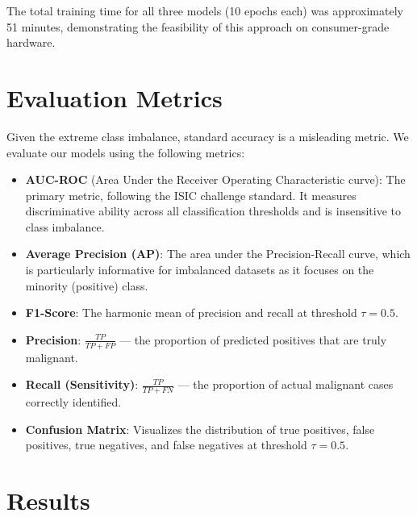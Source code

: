 \documentclass[11pt, a4paper, twocolumn]{article}
\begin{document}
The total training time for all three models (10 epochs each) was
approximately 51 minutes, demonstrating the feasibility of this
approach on consumer-grade hardware.

\section{Evaluation Metrics}
\label{sec:metrics}

Given the extreme class imbalance, standard accuracy is a misleading
metric. We evaluate our models using the following metrics:

\begin{itemize}[noitemsep]
    \item \textbf{AUC-ROC} (Area Under the Receiver Operating
          Characteristic curve): The primary metric, following the
          ISIC challenge standard. It measures discriminative ability
          across all classification thresholds and is insensitive to
          class imbalance.

    \item \textbf{Average Precision (AP)}: The area under the
          Precision-Recall curve, which is particularly informative
          for imbalanced datasets as it focuses on the minority
          (positive) class.

    \item \textbf{F1-Score}: The harmonic mean of precision and recall
          at threshold $\tau = 0.5$.

    \item \textbf{Precision}: $\frac{TP}{TP + FP}$ --- the proportion
          of predicted positives that are truly malignant.

    \item \textbf{Recall (Sensitivity)}: $\frac{TP}{TP + FN}$ --- the
          proportion of actual malignant cases correctly identified.

    \item \textbf{Confusion Matrix}: Visualizes the distribution of
          true positives, false positives, true negatives, and false
          negatives at threshold $\tau = 0.5$.
\end{itemize}

\section{Results}
\label{sec:results}
\end{document}
